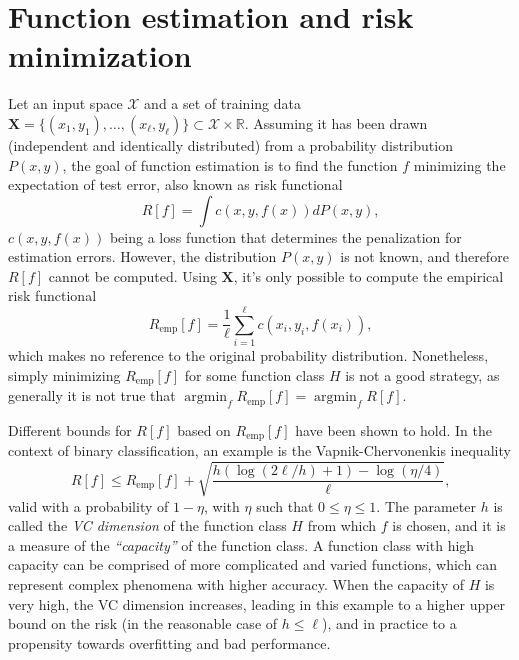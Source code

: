 \documentclass[12pt]{report}
\begin{document}
\section{Function estimation and risk minimization}
Let an input space $ \mathcal{X} $ and a set of training data $ \mathbf{X} = \lbrace (x_{1},y_{1}),\ldots,(x_{\ell},y_{\ell})\rbrace \subset \mathcal{X} \times \mathbb{R} $. Assuming it has been drawn (independent and identically distributed) from a probability distribution $ P(x,y) $, the goal of function estimation is to find the function $ f $ minimizing the expectation of test error, also known as risk functional \cite{vapnik82}
\begin{equation} \label{riskfun}
R[f] = \int c(x,y,f(x))dP(x,y) \text{,}
\end{equation}
$ c(x,y,f(x)) $ being a loss function that determines the penalization for estimation errors. However, the distribution $ P(x,y) $ is not known, and therefore $ R[f] $ cannot be computed. Using $ \mathbf{X} $, it's only possible to compute the empirical risk functional
\begin{equation} \label{empriskfun}
R_{\text{emp}}[f] = \dfrac{1}{\ell} \sum_{i=1}^{\ell}c(x_{i},y_{i},f(x_{i})) \text{,}
\end{equation}
which makes no reference to the original probability distribution. Nonetheless, simply minimizing $ R_{\text{emp}}[f] $ for some function class $ H $ is not a good strategy, as generally it is not true that $ \operatorname*{argmin}_{f} R_{\text{emp}}[f] = \operatorname*{argmin}_{f} R[f] $.

Different bounds for $ R[f] $ based on $ R_{\text{emp}}[f] $ have been shown to hold. In the context of binary classification, an example is the Vapnik-Chervonenkis inequality \cite{vapnik95}
\begin{equation} \label{vapnikbound}
R[f] \leq R_{\text{emp}}[f] + \sqrt{\dfrac{h(\log (2\ell /h) + 1) - \log (\eta /4)}{\ell}} \text{,}
\end{equation}
valid with a probability of $ 1 - \eta $, with $ \eta $ such that $ 0 \leq \eta \leq 1 $. The parameter $ h $ is called the \textit{VC dimension} of the function class $ H $ from which $ f $ is chosen, and it is a measure of the \textit{``capacity''} of the function class. A function class with high capacity can be comprised of more complicated and varied functions, which can represent complex phenomena with higher accuracy. When the capacity of $ H $ is very high, the VC dimension increases, leading in this example to a higher upper bound on the risk (in the reasonable case of $ h \leq \ell $), and in practice to a propensity towards overfitting and bad performance.
\end{document}
